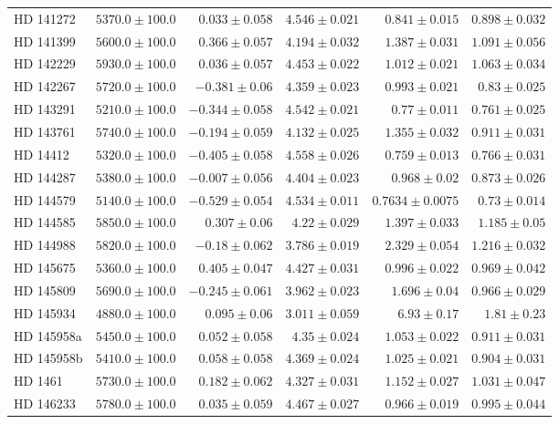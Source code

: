 \begin{longtable*}{lrrrrr}
HD 141272 & $5370.0\pm 100.0$ & $0.033\pm 0.058$ & $4.546\pm 0.021$ & $0.841\pm 0.015$ & $0.898\pm 0.032$ \\ 
HD 141399 & $5600.0\pm 100.0$ & $0.366\pm 0.057$ & $4.194\pm 0.032$ & $1.387\pm 0.031$ & $1.091\pm 0.056$ \\ 
HD 142229 & $5930.0\pm 100.0$ & $0.036\pm 0.057$ & $4.453\pm 0.022$ & $1.012\pm 0.021$ & $1.063\pm 0.034$ \\ 
HD 142267 & $5720.0\pm 100.0$ & $-0.381\pm 0.06$ & $4.359\pm 0.023$ & $0.993\pm 0.021$ & $0.83\pm 0.025$ \\ 
HD 143291 & $5210.0\pm 100.0$ & $-0.344\pm 0.058$ & $4.542\pm 0.021$ & $0.77\pm 0.011$ & $0.761\pm 0.025$ \\ 
HD 143761 & $5740.0\pm 100.0$ & $-0.194\pm 0.059$ & $4.132\pm 0.025$ & $1.355\pm 0.032$ & $0.911\pm 0.031$ \\ 
HD 14412 & $5320.0\pm 100.0$ & $-0.405\pm 0.058$ & $4.558\pm 0.026$ & $0.759\pm 0.013$ & $0.766\pm 0.031$ \\ 
HD 144287 & $5380.0\pm 100.0$ & $-0.007\pm 0.056$ & $4.404\pm 0.023$ & $0.968\pm 0.02$ & $0.873\pm 0.026$ \\ 
HD 144579 & $5140.0\pm 100.0$ & $-0.529\pm 0.054$ & $4.534\pm 0.011$ & $0.7634\pm 0.0075$ & $0.73\pm 0.014$ \\ 
HD 144585 & $5850.0\pm 100.0$ & $0.307\pm 0.06$ & $4.22\pm 0.029$ & $1.397\pm 0.033$ & $1.185\pm 0.05$ \\ 
HD 144988 & $5820.0\pm 100.0$ & $-0.18\pm 0.062$ & $3.786\pm 0.019$ & $2.329\pm 0.054$ & $1.216\pm 0.032$ \\ 
HD 145675 & $5360.0\pm 100.0$ & $0.405\pm 0.047$ & $4.427\pm 0.031$ & $0.996\pm 0.022$ & $0.969\pm 0.042$ \\ 
HD 145809 & $5690.0\pm 100.0$ & $-0.245\pm 0.061$ & $3.962\pm 0.023$ & $1.696\pm 0.04$ & $0.966\pm 0.029$ \\ 
HD 145934 & $4880.0\pm 100.0$ & $0.095\pm 0.06$ & $3.011\pm 0.059$ & $6.93\pm 0.17$ & $1.81\pm 0.23$ \\ 
HD 145958a & $5450.0\pm 100.0$ & $0.052\pm 0.058$ & $4.35\pm 0.024$ & $1.053\pm 0.022$ & $0.911\pm 0.031$ \\ 
HD 145958b & $5410.0\pm 100.0$ & $0.058\pm 0.058$ & $4.369\pm 0.024$ & $1.025\pm 0.021$ & $0.904\pm 0.031$ \\ 
HD 1461 & $5730.0\pm 100.0$ & $0.182\pm 0.062$ & $4.327\pm 0.031$ & $1.152\pm 0.027$ & $1.031\pm 0.047$ \\ 
HD 146233 & $5780.0\pm 100.0$ & $0.035\pm 0.059$ & $4.467\pm 0.027$ & $0.966\pm 0.019$ & $0.995\pm 0.044$ \\ 

\end{longtable*}
